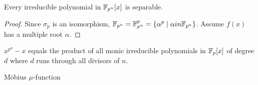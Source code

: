 \begin{lemma}
  Every irreducible polynomial in $\mathbb{F}_{p^n}[x]$ is separable.

  \begin{proof}
    Since $\sigma_p$ is an isomorphism, $\mathbb{F}_{p^n} = \mathbb{F}_{p^n}^p = \{ \alpha^p \mid \alpha in \mathbb{F}_{p^n}\}$.
    Assume $f(x)$ has a multiple root $\alpha$.
  \end{proof}
\end{lemma}

\begin{theorem}
  $x^{p^n} - x$ equals the product of all monic irreducible polynomials in $\mathbb{F}_p[x]$ of degree $d$ where
  $d$ runs through all divisors of $n$.
\end{theorem}

\begin{definition}
  M\"{o}bius $\mu$-function
\end{definition}
